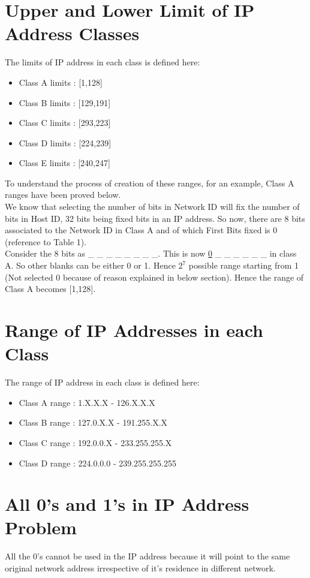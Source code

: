 \documentclass[12pt]{article}
\begin{document}
\section{Upper and Lower Limit of IP Address Classes}
The limits of IP address in each class is defined here:
\begin{itemize}
    \item Class A limits : [1,128]
    \item Class B limits : [129,191]
    \item Class C limits : [293,223]
    \item Class D limits : [224,239]
    \item Class E limits : [240,247]
\end{itemize}
To understand the process of creation of these ranges, for an example, Class A ranges have been proved below. \\
We know that selecting the number of bits in Network ID will fix the number of bits in Host ID, 32 bits being fixed bits in an IP address.
So now, there are 8 bits associated to the Network ID in Class A and of which First Bits fixed is 0 (reference to Table 1). \\
Consider the 8 bits as \_ \_ \_ \_ \_ \_ \_ \_. This is now \underline{0} \_ \_ \_ \_ \_ \_ in class A. So other blanks can be either 0 or 1. Hence $2^{7}$ possible range starting from 1 (Not selected 0 because of reason explained in below section). Hence the range of Class A becomes [1,128].

\section{Range of IP Addresses in each Class}
The range of IP address in each class is defined here:
\begin{itemize}
    \item Class A range : 1.X.X.X - 126.X.X.X
    \item Class B range : 127.0.X.X - 191.255.X.X
    \item Class C range : 192.0.0.X - 233.255.255.X
    \item Class D range : 224.0.0.0 - 239.255.255.255
\end{itemize}

\section{All 0's and 1's in IP Address Problem}
All the 0's cannot be used in the IP address because it will point to the same original network address irrespective of it's residence in different network. 
\end{document}
